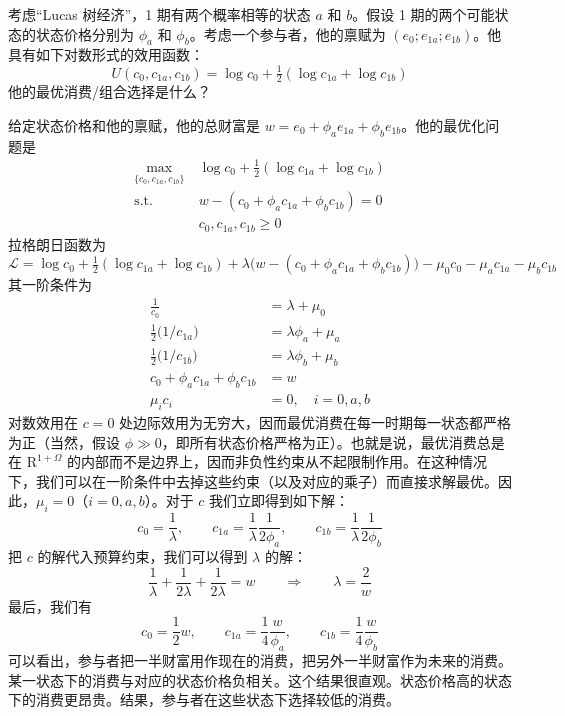 
    \begin{problem}
         考虑“Lucas 树经济”，1 期有两个概率相等的状态 $a$ 和 $b$。假设 1 期的两个可能状态的状态价格分别为 $\phi_{a}$ 和 $\phi_{b}$。考虑一个参与者，他的禀赋为 $(e_{0};e_{1a};e_{1b})$。他具有如下对数形式的效用函数：
        \[
            U(c_{0},c_{1a},c_{1b})=\log c_{0}+\tfrac12(\log c_{1a}+\log c_{1b})
        \]
        他的最优消费/组合选择是什么？
        \end{problem}
        \begin{solution}
        给定状态价格和他的禀赋，他的总财富是 $w=e_{0}+\phi_{a}e_{1a}+\phi_{b}e_{1b}$。他的最优化问题是
        \[
            \begin{aligned}
                \max_{\{c_{0},c_{1a},c_{1b}\}}\ &\log c_{0}+\tfrac12(\log c_{1a}+\log c_{1b})\\
                \mathrm{s.t.}\quad &w-(c_{0}+\phi_{a}c_{1a}+\phi_{b}c_{1b})=0\\
                &c_{0},c_{1a},c_{1b}\ge 0
            \end{aligned}
        \]
        拉格朗日函数为
        \[
            \mathcal{L}=\log c_{0}+\tfrac12(\log c_{1a}+\log c_{1b})+\lambda\bigl(w-(c_{0}+\phi_{a}c_{1a}+\phi_{b}c_{1b})\bigr)-\mu_{0}c_{0}-\mu_{a}c_{1a}-\mu_{b}c_{1b}
        \]
        其一阶条件为
        \[
            \begin{aligned}
                \frac{1}{c_{0}}&=\lambda+\mu_{0}\\
                \tfrac12\bigl(1/c_{1a}\bigr)&=\lambda\phi_{a}+\mu_{a}\\
                \tfrac12\bigl(1/c_{1b}\bigr)&=\lambda\phi_{b}+\mu_{b}\\
                c_{0}+\phi_{a}c_{1a}+\phi_{b}c_{1b}&=w\\
                \mu_{i}c_{i}&=0,\quad i=0,a,b
            \end{aligned}
        \]
        对数效用在 $c=0$ 处边际效用为无穷大，因而最优消费在每一时期每一状态都严格为正（当然，假设 $\phi\gg 0$，即所有状态价格严格为正）。也就是说，最优消费总是在 $\mathrm{R}^{1+\Omega}$ 的内部而不是边界上，因而非负性约束从不起限制作用。在这种情况下，我们可以在一阶条件中去掉这些约束（以及对应的乘子）而直接求解最优。因此，$\mu_{i}=0$（$i=0,a,b$）。对于 $c$ 我们立即得到如下解：
        \[
            c_{0}=\frac{1}{\lambda},\qquad
            c_{1a}=\frac{1}{\lambda}\frac{1}{2\phi_{a}},\qquad
            c_{1b}=\frac{1}{\lambda}\frac{1}{2\phi_{b}}
        \]
        把 $c$ 的解代入预算约束，我们可以得到 $\lambda$ 的解：
        \[
            \frac{1}{\lambda}+\frac{1}{2\lambda}+\frac{1}{2\lambda}=w\qquad\Rightarrow\qquad\lambda=\frac{2}{w}
        \]
        最后，我们有
        \[
            c_{0}=\frac12 w,\qquad
            c_{1a}=\frac14\frac{w}{\phi_{a}},\qquad
            c_{1b}=\frac14\frac{w}{\phi_{b}}
        \]
        可以看出，参与者把一半财富用作现在的消费，把另外一半财富作为未来的消费。某一状态下的消费与对应的状态价格负相关。这个结果很直观。状态价格高的状态下的消费更昂贵。结果，参与者在这些状态下选择较低的消费。
        \end{solution}


